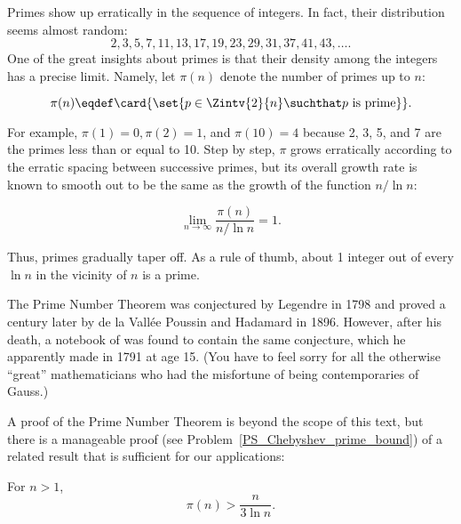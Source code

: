 Primes show up erratically in the sequence of integers.  In fact,
their distribution seems almost random:
\[
2, 3, 5, 7, 11, 13, 17, 19, 23, 29, 31, 37, 41, 43, \dots.
\]
One of the great insights about primes is that their density among the
integers has a precise limit.  Namely, let $\pi(n)$ denote the number
of primes up to $n$:

\begin{definition}\label{def:prime<x}
\[
  \pi(n) \eqdef \card{\set{p \in \Zintv{2}{n} \suchthat p \text{ is
        prime}}}.
\]
\end{definition}

For example, $\pi(1) = 0, \pi(2) = 1$, and $\pi(10) = 4$ because 2, 3,
5, and 7 are the primes less than or equal to 10.  Step by step,
$\pi$ grows erratically according to the erratic spacing between
successive primes, but its overall growth rate is known to smooth out
to be the same as the growth of the function $n/\ln n$:

\begin{theorem}%
\[
\lim_{n\to\infty} \frac{\pi(n)}{n/\ln n} = 1.
\]
\end{theorem}

Thus, primes gradually taper off.  As a rule of thumb, about 1 integer
out of every $\ln n$ in the vicinity of $n$ is a prime.


The Prime Number Theorem was conjectured by Legendre in 1798 and
proved a century later by de la Vall\'{e}e Poussin and Hadamard in 1896.
However, after his death, a notebook of  was found to contain the
same conjecture, which he apparently made in 1791 at age 15.  (You
have to feel sorry for all the otherwise ``great'' mathematicians who
had the misfortune of being contemporaries of Gauss.)

A proof of the Prime Number Theorem is beyond the scope of this text,
but there is a manageable proof (see
Problem~\ref{PS_Chebyshev_prime_bound}) of a related result that is
sufficient for our applications:
\begin{theorem}
For $n >1$,
\[
\pi(n) > \frac{n}{3 \ln n}.
\]
\end{theorem}

